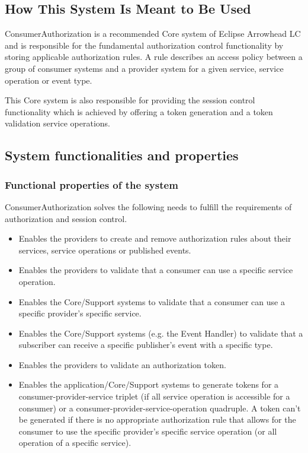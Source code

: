 \documentclass[a4paper]{arrowhead}
\begin{document}
\subsection{How This System Is Meant to Be Used}
\label{sec:use}

ConsumerAuthorization is a recommended Core system of Eclipse Arrowhead LC and is responsible for the fundamental authorization control functionality by storing applicable authorization rules. A rule describes an access policy between a group of consumer systems and a provider system for a given service, service operation or event type.

This Core system is also responsible for providing the session control functionality which is achieved by offering a token generation and a token validation service operations. 

\subsection{System functionalities and properties}
\label{sec:properties}

\subsubsection {Functional properties of the system}

ConsumerAuthorization solves the following needs to fulfill the requirements of authorization and session control.

\begin{itemize}
    \item Enables the providers to create and remove authorization rules about their services, service operations or published events.
    \item Enables the providers to validate that a consumer can use a specific service operation.
    \item Enables the Core/Support systems to validate that a consumer can use a specific provider's specific service.
    \item Enables the Core/Support systems (e.g. the Event Handler) to validate that a subscriber can receive a specific publisher's event with a specific type.
    \item Enables the providers to validate an authorization token.
    \item Enables the application/Core/Support systems to generate tokens for a consumer-provider-service triplet (if all service operation is accessible for a consumer) or a consumer-provider-service-operation quadruple.
    A token can't be generated if there is no appropriate authorization rule that allows for the consumer to use the specific provider's specific service operation (or all operation of a specific service). 
\end{itemize}
\end{document}
